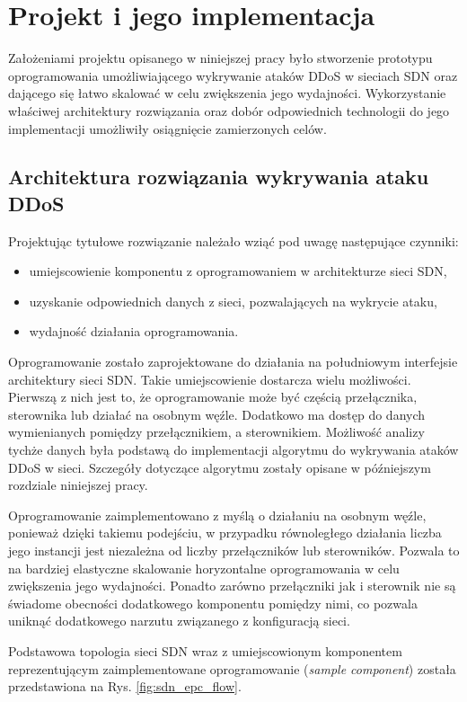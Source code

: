 \chapter{Projekt i jego implementacja}

Założeniami projektu opisanego w niniejszej pracy było stworzenie prototypu
oprogramowania umożliwiającego wykrywanie ataków DDoS w sieciach SDN oraz
dającego się łatwo skalować w celu zwiększenia jego wydajności. Wykorzystanie
właściwej architektury rozwiązania oraz dobór odpowiednich technologii do jego
implementacji umożliwiły osiągnięcie zamierzonych celów.

\section{Architektura rozwiązania wykrywania ataku DDoS}

Projektując tytułowe rozwiązanie należało wziąć pod uwagę następujące czynniki:
\begin{itemize}
  \item umiejscowienie komponentu z oprogramowaniem w architekturze sieci SDN,
  \item uzyskanie odpowiednich danych z sieci, pozwalających na wykrycie ataku,
  \item wydajność działania oprogramowania.
\end{itemize}

Oprogramowanie zostało zaprojektowane do działania na południowym interfejsie
architektury sieci SDN. Takie umiejscowienie dostarcza wielu możliwości.
Pierwszą z nich jest to, że oprogramowanie może być częścią przełącznika,
sterownika lub działać na osobnym węźle. Dodatkowo ma dostęp do danych
wymienianych pomiędzy przełącznikiem, a sterownikiem. Możliwość analizy tychże
danych była podstawą do implementacji algorytmu do wykrywania ataków DDoS w
sieci. Szczegóły dotyczące algorytmu zostały opisane w późniejszym rozdziale
niniejszej pracy.

Oprogramowanie zaimplementowano z myślą o działaniu na osobnym węźle,
ponieważ dzięki takiemu podejściu, w przypadku równoległego działania liczba
jego instancji jest niezależna od liczby przełączników lub sterowników. Pozwala
to na bardziej elastyczne skalowanie horyzontalne oprogramowania w celu
zwiększenia jego wydajności. Ponadto zarówno przełączniki jak i sterownik nie są
świadome obecności dodatkowego komponentu pomiędzy nimi, co pozwala uniknąć
dodatkowego narzutu związanego z konfiguracją sieci.

Podstawowa topologia sieci SDN wraz z umiejscowionym komponentem reprezentującym
zaimplementowane oprogramowanie (\textit{sample component}) została
przedstawiona na Rys. \ref{fig:sdn_epc_flow}. 

